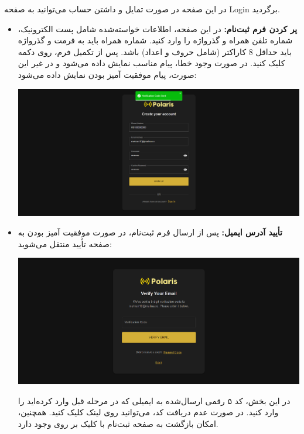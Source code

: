 \begin{itemize}
\begin{center}
    		\end{center}
    		در این صفحه در صورت تمایل و داشتن حساب می‌توانید به صفحه Login برگردید.
    	\begin{itemize}
    		\item \textbf{پر کردن فرم ثبت‌نام:}  
    		در این صفحه، اطلاعات خواسته‌شده شامل پست الکترونیک، شماره تلفن همراه و گذرواژه را وارد کنید. شماره همراه باید به فرمت  و گذرواژه باید حداقل 8 کاراکتر (شامل حروف و اعداد) باشد. پس از تکمیل فرم، روی دکمه  کلیک کنید. در صورت وجود خطا، پیام مناسب نمایش داده می‌شود و در غیر این صورت، پیام موفقیت آمیز بودن نمایش داده می‌شود:
    			\begin{center}
    				\includegraphics[width=\textwidth]{images/fr-signup-success.png}
    			\end{center}
    		\item \textbf{تأیید آدرس ایمیل:}  
    		پس از ارسال فرم ثبت‌نام، در صورت موفقیت آمیز بودن به صفحه تأیید منتقل می‌شوید:
    		\begin{center}
    			\includegraphics[width=\textwidth]{images/fr-verify-empty.png}
    		\end{center}
    		در این بخش، کد ۵ رقمی ارسال‌شده به ایمیلی که در مرحله قبل وارد کرده‌اید را وارد کنید. در صورت عدم دریافت کد، می‌توانید روی لینک  کلیک کنید. همچنین، امکان بازگشت به صفحه ثبت‌نام با کلیک بر روی  وجود دارد.  

\end{itemize}
\end{itemize}
